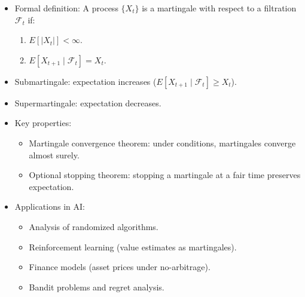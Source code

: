 \documentclass[
  letterpaper,
  DIV=11,
  numbers=noendperiod]{scrreprt}
\providecommand{\tightlist}{%
  \setlength{\itemsep}{0pt}\setlength{\parskip}{0pt}}
\begin{document}
\begin{itemize}
\item
  Formal definition: A process \(\{X_t\}\) is a martingale with respect
  to a filtration \(\mathcal{F}_t\) if:

  \begin{enumerate}
  \def\labelenumi{\arabic{enumi}.}
  \tightlist
  \item
    \(E[|X_t|] < \infty\).
  \item
    \(E[X_{t+1} \mid \mathcal{F}_t] = X_t\).
  \end{enumerate}
\item
  Submartingale: expectation increases
  (\(E[X_{t+1}\mid \mathcal{F}_t] \geq X_t\)).
\item
  Supermartingale: expectation decreases.
\item
  Key properties:

  \begin{itemize}
  \tightlist
  \item
    Martingale convergence theorem: under conditions, martingales
    converge almost surely.
  \item
    Optional stopping theorem: stopping a martingale at a fair time
    preserves expectation.
  \end{itemize}
\item
  Applications in AI:

  \begin{itemize}
  \tightlist
  \item
    Analysis of randomized algorithms.
  \item
    Reinforcement learning (value estimates as martingales).
  \item
    Finance models (asset prices under no-arbitrage).
  \item
    Bandit problems and regret analysis.
  \end{itemize}
\end{itemize}
\end{document}
